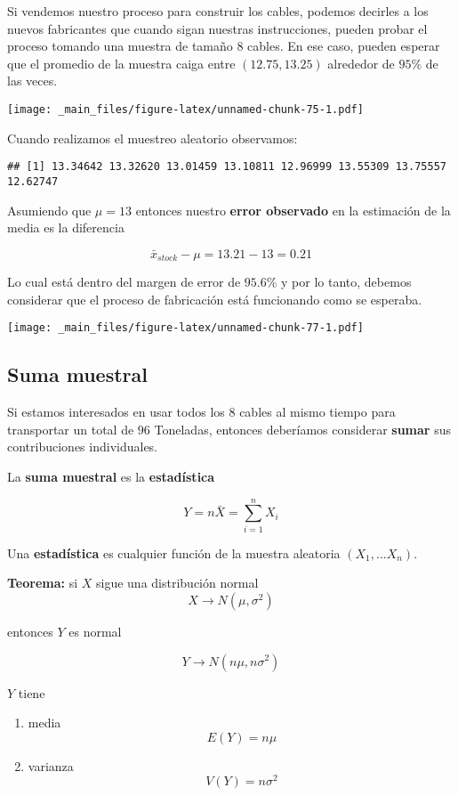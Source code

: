 \documentclass[
]{book}
\providecommand{\tightlist}{%
  \setlength{\itemsep}{0pt}\setlength{\parskip}{0pt}}
\begin{document}
Si vendemos nuestro proceso para construir los cables, podemos decirles a los nuevos fabricantes que cuando sigan nuestras instrucciones, pueden probar el proceso tomando una muestra de tamaño \(8\) cables. En ese caso, pueden esperar que el promedio de la muestra caiga entre \((12.75, 13.25)\) alrededor de \(95\%\) de las veces.

\texttt{[image: \_main\_files/figure-latex/unnamed-chunk-75-1.pdf]}

Cuando realizamos el muestreo aleatorio observamos:

\begin{verbatim}
## [1] 13.34642 13.32620 13.01459 13.10811 12.96999 13.55309 13.75557 12.62747
\end{verbatim}

Asumiendo que \(\mu=13\) entonces nuestro \textbf{error observado} en la estimación de la media es la diferencia

\[\bar{x}_{stock}-\mu=13.21-13=0.21\]

Lo cual está dentro del margen de error de \(95.6\%\) y por lo tanto, debemos considerar que el proceso de fabricación está funcionando como se esperaba.

\texttt{[image: \_main\_files/figure-latex/unnamed-chunk-77-1.pdf]}

\hypertarget{suma-muestral}{%
\subsection{Suma muestral}\label{suma-muestral}}

Si estamos interesados en usar todos los \(8\) cables al mismo tiempo para transportar un total de \(96\) Toneladas, entonces deberíamos considerar \textbf{sumar} sus contribuciones individuales.

La \textbf{suma muestral} es la \textbf{estadística}

\[Y=n \bar{X}=\sum_{i=1}^n X_i\]

Una \textbf{estadística} es cualquier función de la muestra aleatoria \((X_1, ... X_n)\).

\textbf{Teorema:} si \(X\) sigue una distribución normal
\[X \rightarrow N(\mu, \sigma^2)\]

entonces \(Y\) es normal

\[Y \rightarrow N(n\mu, n\sigma^2)\]

\(Y\) tiene

\begin{enumerate}
\def\labelenumi{\arabic{enumi})}
\tightlist
\item
  media \[E(Y)=n\mu\]
\item
  varianza \[V(Y)=n\sigma^2\]
\end{enumerate}
\end{document}
